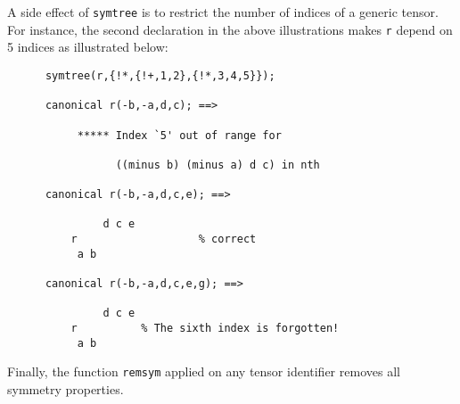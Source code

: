 A side effect of \texttt{symtree} is to restrict the number of indices of
a generic tensor. For instance, the second declaration in the above
illustrations makes \texttt{r} depend on 5 indices as illustrated below:
\begin{verbatim}
      symtree(r,{!*,{!+,1,2},{!*,3,4,5}});

      canonical r(-b,-a,d,c); ==>

           ***** Index `5' out of range for

                 ((minus b) (minus a) d c) in nth

      canonical r(-b,-a,d,c,e); ==>

               d c e
          r                   % correct
           a b

      canonical r(-b,-a,d,c,e,g); ==>

               d c e
          r          % The sixth index is forgotten!
           a b
\end{verbatim}
Finally, the function \texttt{remsym} applied on any tensor
identifier removes all symmetry properties.

